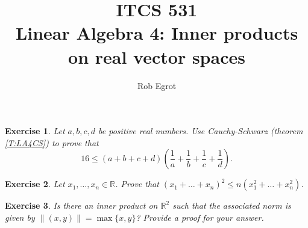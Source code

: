 \documentclass{article}
\title{ITCS 531 \\Linear Algebra 4:  Inner products on real vector spaces}
\author{Rob Egrot}
\date{}
\theoremstyle{plain}
\newtheorem{Q}{Exercise}{\bfseries}{\upshape}
\newcommand{\bR}{\mathbb{R}}
\begin{document}
\maketitle

\begin{Q}
Let $a,b,c,d$ be positive real numbers. Use Cauchy-Schwarz (theorem \ref{T:LA4CS}) to prove that 
\[16 \leq (a+b+c+d)(\frac{1}{a} + \frac{1}{b} + \frac{1}{c} + \frac{1}{d}).\]
\end{Q}
\begin{comment}
\textbf{Solution:}
Let $u = (\sqrt{a} , \sqrt b, \sqrt{c}, \sqrt{d})$, and let $v = (\frac{1}{\sqrt a},\frac{1}{\sqrt b}\frac{1}{\sqrt c},\frac{1}{\sqrt d})$. Then $\langle u, v \rangle^2 = (1+1+1+1)^2 = 16$. Also, $\| u\|^2 = \langle u,u\rangle = a+b+c+d$, and $\| v\|^2 = \langle v,v\rangle = \frac{1}{a}+\frac{1}{b}+\frac{1}{c}+\frac{1}{d}$. By Cauchy-Schwarz we have $\langle u, v \rangle^2\leq\| u\|^2\| v\|^2$. I.e. $16\leq (a+b+c+d)(\frac{1}{a}+\frac{1}{b}+\frac{1}{c}+\frac{1}{d})$, which is what we want to prove.   
\end{comment}

\begin{Q}
Let $x_1,\ldots ,x_n\in\bR$. Prove that $(x_1+\ldots +x_n)^2\leq n(x_1^2+\ldots +x_n^2)$. 
\end{Q}
\begin{comment}
\textbf{Solution:}
Let $u = (x_1,\ldots,x_n)$, and let $v = (1,\ldots,1)$. So $\langle u, v\rangle^2 = (x_1+\ldots+x_n)^2$. Also, $\|u\|^2 = x_1^2+\ldots+ x_n^2$, and $\|v\|^2 = 1+1+\ldots+1 = n$. So, by Cauchy-Schwarz, we have $(x_1+\ldots+x_n)^2\leq n( x_1^2+\ldots+ x_n^2)$ as claimed. 
\end{comment}

\begin{Q}
Is there an inner product on $\bR^2$ such that the associated norm is given by $\|(x,y)\| = \max\{x, y\}$? Provide a proof for your answer.
\end{Q}
\begin{comment}
\textbf{Solution:}
No. For example, think about when both $x$ and $y$ are negative. Then $\max\{x, y\}$ is also negative, but norms are never negative. 
\end{comment}
\end{document}
